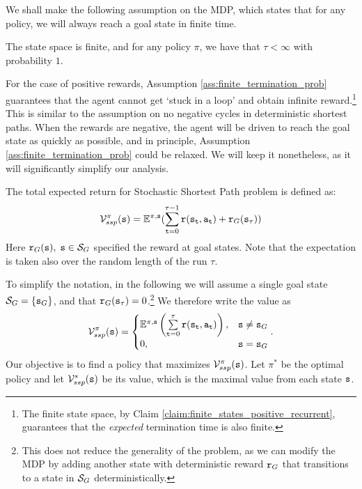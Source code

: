We shall make the following assumption on the MDP, which states that for any policy, we will always reach a goal state in finite time.
\begin{assumption}\label{ass:finite_termination_prob}
    The state space is finite, and for any policy $\pi$, we have that $\tau < \infty$ with probability $1$.
\end{assumption}

For the case of positive rewards, Assumption \ref{ass:finite_termination_prob} guarantees that the agent cannot get `stuck in a loop' and obtain infinite reward.\footnote{The finite state space, by Claim \ref{claim:finite_states_positive_recurrent}, guarantees that the \textit{expected} termination time is also finite.}
This is similar to the assumption on no negative cycles in deterministic shortest paths. When the rewards are negative, the agent will be driven to reach the goal state as quickly as possible, and in principle, Assumption \ref{ass:finite_termination_prob} could be relaxed. 
We will keep it nonetheless, as it will significantly simplify our analysis. 

The total expected return for Stochastic Shortest Path problem is defined as:
\[\mathcal{V}_{ssp}^\pi ({\tt s}) = {\mathbb{E}^{\pi ,{\tt s}}}(\sum\limits_{{\tt t} = 0}^{\tau  - 1} {{\tt r}({{\tt s}_{\tt t}},{{\tt a}_{\tt t}})}  + {{\tt r}_G}({{\tt s}_\tau }))\]
Here ${{\tt r}_G}({\tt s}),\;{\tt s} \in {\mathcal{S}_G}$ specified the
reward at goal states. 
Note that the expectation is taken also over the random length of the run $\tau$.

To simplify the notation, in the following we will assume a single goal state $\mathcal{S}_G = \{ {\tt s}_G \}$, and that ${{\tt r}_G}({{\tt s}_\tau }) = 0$.\footnote{This does not reduce the generality of the problem, as we can modify the MDP by adding another state with deterministic reward ${\tt r}_G$ that transitions to a state in $\mathcal{S}_G$ deterministically.}  We therefore write the value as 
\begin{equation}\label{eq:ssp_objective}
    \mathcal{V}_{ssp}^\pi ({\tt s}) = \begin{cases}
        {\ensuremath{\mathbb{E}}^{\pi,{\tt s}}}\left(\sum\limits_{{\tt t} = 0}^{\tau} {{\tt r}({{\tt s}_{\tt t}},{{\tt a}_{\tt t}})}\right), & {\tt s} \neq {\tt s}_G\\
        0, & {\tt s} = {\tt s}_G
    \end{cases}.
\end{equation}
Our objective is to find a policy that maximizes $\mathcal{V}_{ssp}^\pi ({\tt s})$. Let $\pi^*$ be the optimal policy and let $\mathcal{V}_{ssp}^*({\tt s})$ be its value, which is the maximal value from each state ${\tt s}$.

